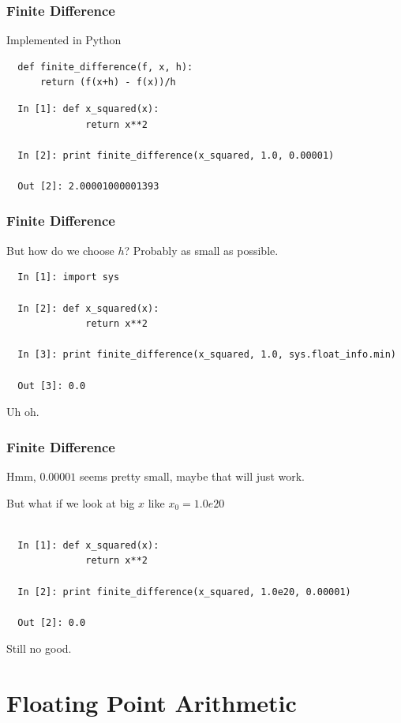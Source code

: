 \documentclass{beamer}
\begin{document}
\begin{frame}[fragile]
\frametitle{Finite Difference}

Implemented in Python


\begin{lstlisting}
  def finite_difference(f, x, h):
      return (f(x+h) - f(x))/h
\end{lstlisting}

\begin{lstlisting}
  In [1]: def x_squared(x):
              return x**2

  In [2]: print finite_difference(x_squared, 1.0, 0.00001)

  Out [2]: 2.00001000001393
\end{lstlisting}

\end{frame}

\begin{frame}[fragile]
\frametitle{Finite Difference}

But how do we choose $h$? Probably as small as possible.

\begin{lstlisting}
  In [1]: import sys

  In [2]: def x_squared(x):
              return x**2

  In [3]: print finite_difference(x_squared, 1.0, sys.float_info.min)

  Out [3]: 0.0
\end{lstlisting}

Uh oh.

\end{frame}

\begin{frame}[fragile]
\frametitle{Finite Difference}

Hmm, $0.00001$ seems pretty small, maybe that will just work.

But what if we look at big $x$ like $x_0 = 1.0e20$

\begin{lstlisting}

  In [1]: def x_squared(x):
              return x**2

  In [2]: print finite_difference(x_squared, 1.0e20, 0.00001)

  Out [2]: 0.0
\end{lstlisting}

Still no good.

\end{frame}

\section{Floating Point Arithmetic}
\end{document}
